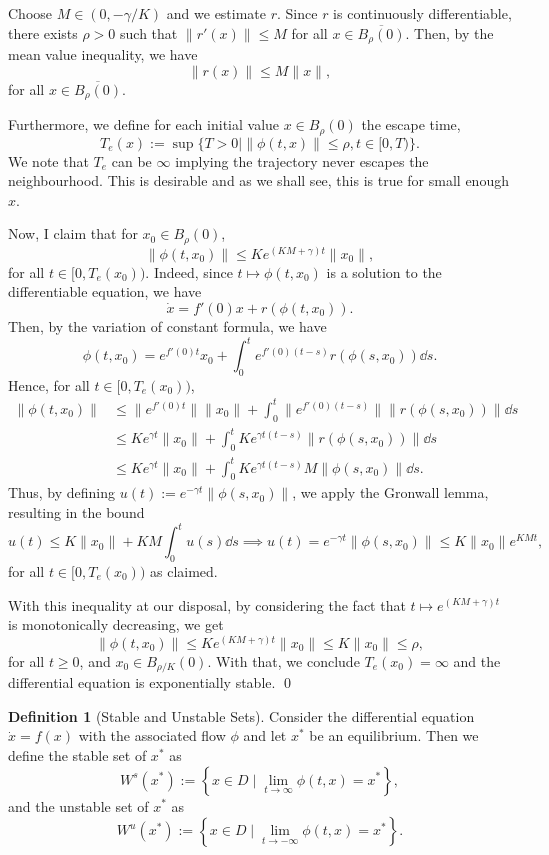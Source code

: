 \documentclass[
]{article}
\theoremstyle{definition}
\theoremstyle{definition}
\newtheorem{definition}{Definition}[section]
\begin{document}
Choose \(M \in (0, - \gamma / K)\) and we estimate \(r\). Since \(r\) is
continuously differentiable, there exists \(\rho > 0\) such that
\(\|r'(x)\| \le M\) for all \(x \in \overline{B_\rho(0)}\). Then, by the
mean value inequality, we have \[\|r(x)\| \le M \|x\|,\] for all
\(x \in \overline{B_\rho(0)}\).

Furthermore, we define for each initial value \(x \in B_\rho(0)\) the
escape time,
\[T_e(x) := \sup\{ T > 0 \mid \|\phi(t, x)\| \le \rho, t \in [0, T)\}.\]
We note that \(T_e\) can be \(\infty\) implying the trajectory never
escapes the neighbourhood. This is desirable and as we shall see, this
is true for small enough \(x\).

Now, I claim that for \(x_0 \in B_\rho(0)\),
\[\|\phi(t, x_0)\| \le K e^{(KM + \gamma)t}\|x_0\|,\] for all
\(t \in [0, T_e(x_0))\). Indeed, since \(t \mapsto \phi(t, x_0)\) is a
solution to the differentiable equation, we have
\[\dot x = f'(0)x + r(\phi(t, x_0)).\] Then, by the variation of
constant formula, we have
\[\phi(t, x_0) = e^{f'(0)t}x_0 + \int_0^t e^{f'(0)(t - s)}r(\phi(s, x_0)) \dd s.\]
Hence, for all \(t \in [0, T_e(x_0))\), \[\begin{split}
    \|\phi(t, x_0)\| 
      & \le \|e^{f'(0)t}\| \|x_0\| + \int_0^t \|e^{f'(0)(t - s)}\| \|r(\phi(s, x_0))\| \dd s\\
      & \le K e^{\gamma t}\|x_0\| + \int_0^t K e^{\gamma t(t - s)} \|r(\phi(s, x_0))\| \dd s\\
      & \le K e^{\gamma t}\|x_0\| + \int_0^t K e^{\gamma t(t - s)} M \|\phi(s, x_0)\| \dd s.
  \end{split}\] Thus, by defining
\(u(t) := e^{-\gamma t}\|\phi(s, x_0)\|\), we apply the Gronwall lemma,
resulting in the bound
\[u(t) \le K\|x_0\| + KM \int_0^t u(s) \dd s \implies 
    u(t) = e^{-\gamma t}\|\phi(s, x_0)\| \le K\|x_0\| e^{KMt},\] for all
\(t \in [0, T_e(x_0))\) as claimed.

With this inequality at our disposal, by considering the fact that
\(t \mapsto e^{(KM + \gamma)t}\) is monotonically decreasing, we get
\[\|\phi(t, x_0)\| \le Ke^{(KM + \gamma)t}\|x_0\| \le K\|x_0\| \le \rho,\]
for all \(t \ge 0\), and \(x_0 \in B_{\rho / K}(0)\). With that, we
conclude \(T_e(x_0) = \infty\) and the differential equation is
exponentially stable. \qed

\begin{definition}[Stable and Unstable Sets]
  Consider the differential equation \(\dot x = f(x)\) with the associated 
  flow \(\phi\) and let \(x^*\) be an equilibrium. Then we define the 
  stable set of \(x^*\) as 
  \[W^s(x^*) := \left\{x \in D \mid \lim_{t \to \infty} \phi(t, x) = x^*\right\},\]
  and the unstable set of \(x^*\) as 
  \[W^u(x^*) := \left\{x \in D \mid \lim_{t \to -\infty} \phi(t, x) = x^*\right\}.\]
\end{definition}
\end{document}
